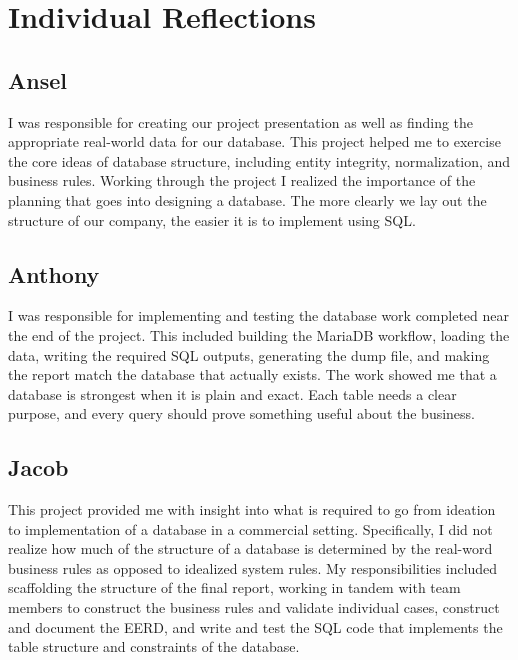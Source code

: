 \section{Individual Reflections}

\subsection*{Ansel}

I was responsible for creating our project presentation as well as finding the appropriate real-world data for our database. This project helped me to exercise the core ideas of database structure, including entity integrity, normalization, and business rules. Working through the project I realized the importance of the planning that goes into designing a database. The more clearly we lay out the structure of our company, the easier it is to implement using SQL.

\subsection*{Anthony}

I was responsible for implementing and testing the database work completed near the end of the project. This included building the MariaDB workflow, loading the data, writing the required SQL outputs, generating the dump file, and making the report match the database that actually exists. The work showed me that a database is strongest when it is plain and exact. Each table needs a clear purpose, and every query should prove something useful about the business.

\subsection*{Jacob}

This project provided me with insight into what is required to go from ideation to implementation of a database in a commercial setting. Specifically, I did not realize how much of the structure of a database is determined by the real-word business rules as opposed to idealized system rules. My responsibilities included scaffolding the structure of the final report, working in tandem with team members to construct the business rules and validate individual cases, construct and document the EERD, and write and test the SQL code that implements the table structure and constraints of the database.
